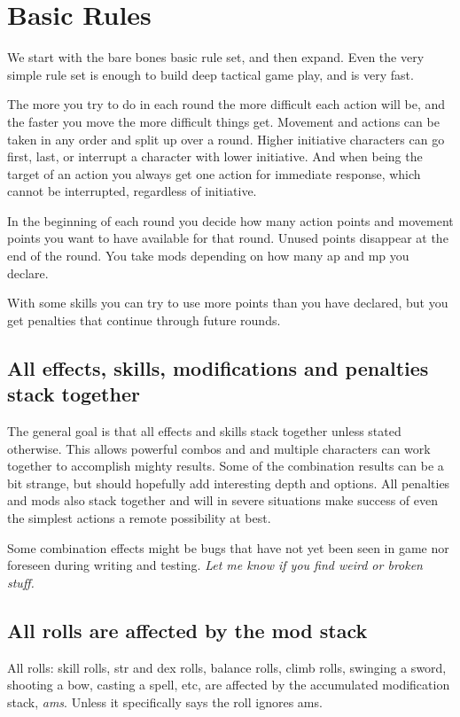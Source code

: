 
\section*{Basic Rules}
We start with the bare bones basic rule set, and then expand. Even the very simple rule set is enough to build deep tactical game play, and is very fast.

The more you try to do in each round the more difficult each action will be, and the faster you move the more difficult things get. Movement and actions can be taken in any order and split up over a round. Higher initiative characters can go first, last, or interrupt a character with lower initiative. And when being the target of an action you always get one action for immediate response, which cannot be interrupted, regardless of initiative.

In the beginning of each round you decide how many action points and movement points you want to have available for that round. Unused points disappear at the end of the round. You take mods depending on how many ap and mp you declare.

With some skills you can try to use more points than you have declared, but you get penalties that continue through future rounds.


\subsection*{All effects, skills, modifications and penalties stack together}
The general goal is that all effects and skills stack together unless stated otherwise. This allows powerful combos and and multiple characters can work together to accomplish mighty results. Some of the combination results can be a bit strange, but should hopefully add interesting depth and options.
All penalties and mods also stack together and will in severe situations make success of even the simplest actions a remote possibility at best.

Some combination effects might be bugs that have not yet been seen in game nor foreseen during writing and testing. \emph{Let me know if you find weird or broken stuff.}


\subsection*{All rolls are affected by the mod stack}
All rolls: skill rolls, str and dex rolls, balance rolls, climb rolls, swinging a sword, shooting a bow, casting a spell, etc, are affected by the accumulated modification stack, \emph{ams}. Unless it specifically says the roll ignores ams.

